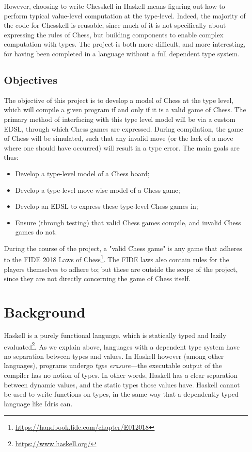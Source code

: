 \documentclass[12pt, a4paper, bibliography=totocnumbered]{scrreprt}
\begin{document}
However, choosing to write Chesskell in Haskell means figuring out how to perform typical value-level computation at the type-level. Indeed, the majority of the code for Chesskell is reusable, since much of it is not specifically about expressing the rules of Chess, but building components to enable complex computation with types. The project is both more difficult, and more interesting, for having been completed in a language without a full dependent type system.

\section{Objectives}

The objective of this project is to develop a model of Chess at the type level, which will compile a given program if and only if it is a valid game of Chess. The primary method of interfacing with this type level model will be via a custom EDSL, through which Chess games are expressed. During compilation, the game of Chess will be simulated, such that any invalid move (or the lack of a move where one should have occurred) will result in a type error. The main goals are thus:

\begin{itemize}
    \item Develop a type-level model of a Chess board;
    \item Develop a type-level move-wise model of a Chess game;
    \item Develop an EDSL to express these type-level Chess games in;
    \item Ensure (through testing) that valid Chess games compile, and invalid Chess games do not.
\end{itemize}

During the course of the project, a "valid Chess game" is any game that adheres to the FIDE 2018 Laws of Chess\footnote{\url{https://handbook.fide.com/chapter/E012018}}. The FIDE laws also contain rules for the players themselves to adhere to; but these are outside the scope of the project, since they are not directly concerning the game of Chess itself.


\chapter{Background}

Haskell is a purely functional language, which is statically typed and lazily evaluated\footnote{\url{https://www.haskell.org/}}. As we explain above, languages with a dependent type system have no separation between types and values. In Haskell however (among other languages), programs undergo \emph{type erasure}---the executable output of the compiler has no notion of types. In other words, Haskell has a clear separation between dynamic values, and the static types those values have. Haskell cannot be used to write functions on types, in the same way that a dependently typed language like Idris can.
\end{document}
